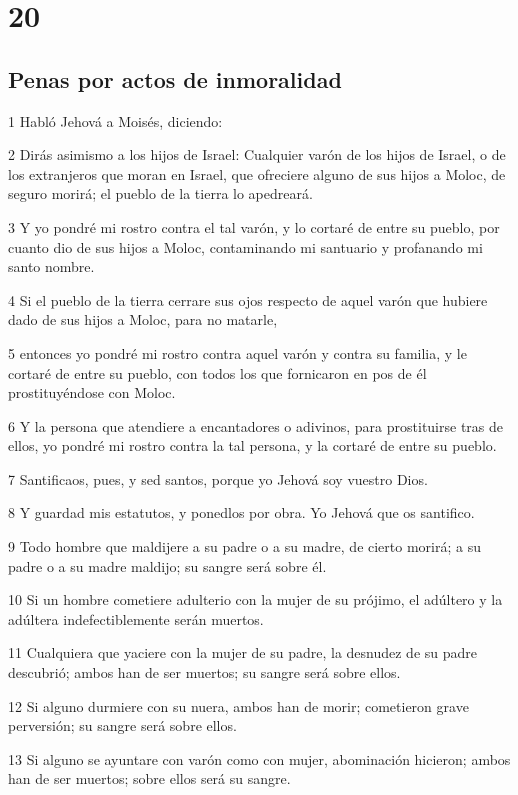 \chapter{20}

\section*{Penas por actos de inmoralidad}

\par 1 Habló Jehová a Moisés, diciendo:
\par 2 Dirás asimismo a los hijos de Israel: Cualquier varón de los hijos de Israel, o de los extranjeros que moran en Israel, que ofreciere alguno de sus hijos a Moloc, de seguro morirá; el pueblo de la tierra lo apedreará.
\par 3 Y yo pondré mi rostro contra el tal varón, y lo cortaré de entre su pueblo, por cuanto dio de sus hijos a Moloc, contaminando mi santuario y profanando mi santo nombre.
\par 4 Si el pueblo de la tierra cerrare sus ojos respecto de aquel varón que hubiere dado de sus hijos a Moloc, para no matarle,
\par 5 entonces yo pondré mi rostro contra aquel varón y contra su familia, y le cortaré de entre su pueblo, con todos los que fornicaron en pos de él prostituyéndose con Moloc.
\par 6 Y la persona que atendiere a encantadores o adivinos, para prostituirse tras de ellos, yo pondré mi rostro contra la tal persona, y la cortaré de entre su pueblo.
\par 7 Santificaos, pues, y sed santos, porque yo Jehová soy vuestro Dios.
\par 8 Y guardad mis estatutos, y ponedlos por obra. Yo Jehová que os santifico.
\par 9 Todo hombre que maldijere a su padre o a su madre, de cierto morirá; a su padre o a su madre maldijo; su sangre será sobre él.
\par 10 Si un hombre cometiere adulterio con la mujer de su prójimo, el adúltero y la adúltera indefectiblemente serán muertos.
\par 11 Cualquiera que yaciere con la mujer de su padre, la desnudez de su padre descubrió; ambos han de ser muertos; su sangre será sobre ellos.
\par 12 Si alguno durmiere con su nuera, ambos han de morir; cometieron grave perversión; su sangre será sobre ellos.
\par 13 Si alguno se ayuntare con varón como con mujer, abominación hicieron; ambos han de ser muertos; sobre ellos será su sangre.
